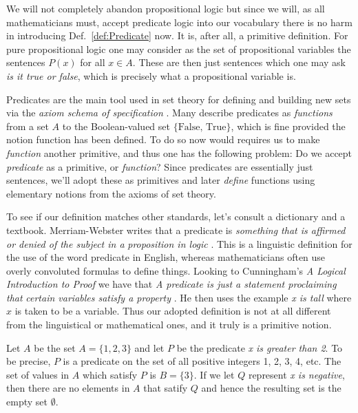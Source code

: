         We will not completely abandon propositional logic but since we will,
        as all mathematicians must, accept predicate logic into our vocabulary
        there is no harm in introducing Def.~\ref{def:Predicate} now. It is,
        after all, a primitive definition. For pure propositional logic one may
        consider as the set of propositional variables the sentences
        $P(x)$ for all $x\in{A}$. These are then just sentences which one may
        ask \textit{is it true or false}, which is precisely what a
        propositional variable is.
        \par\hfill\par
        Predicates are the main tool used in set theory for defining and
        building new sets via the \textit{axiom schema of specification}%
        . Many describe predicates as
        \textit{functions} from a set $A$ to the Boolean-valued set
        $\{\text{False},\,\text{True}\}$, which is fine provided the notion
        function has been defined. To do so now would requires us to make
        \textit{function} another primitive, and thus one has the following
        problem: Do we accept \textit{predicate} as a primitive, or
        \textit{function}? Since predicates are essentially just sentences,
        we'll adopt these as primitives and later \textit{define} functions
        using elementary notions from the axioms of set theory.
        \par\hfill\par
        To see if our definition matches other standards, let's consult a
        dictionary and a textbook. Merriam-Webster writes that a predicate is
        \textit{something that is affirmed or denied of the subject in a}
        \textit{proposition in logic} \cite{MerriamWebsterPredicateDef}. This is
        a linguistic definition for the use of the word predicate in English,
        whereas mathematicians often use overly convoluted formulas to define
        things. Looking to Cunningham's \textit{A Logical Introduction to Proof}
        we have that \textit{A predicate is just a statement proclaiming that}
        \textit{certain variables satisfy a property}
        \cite{Cunningham2010}. He then uses the example \textit{x is tall} where
        $x$ is taken to be a variable. Thus our adopted definition is not at all
        different from the linguistical or mathematical ones, and it truly is a
        primitive notion.
        \begin{example}
            Let $A$ be the set $A=\{1,2,3\}$ and let $P$ be the predicate
            \textit{x is greater than 2}. To be precise, $P$ is a predicate on
            the set of all positive integers 1, 2, 3, 4, etc. The set of values
            in $A$ which satisfy $P$ is $B=\{3\}$. If we let $Q$ represent
            \textit{x is negative}, then there are no elements in $A$ that
            satify $Q$ and hence the resulting set is the empty set $\emptyset$.
        \end{example}
